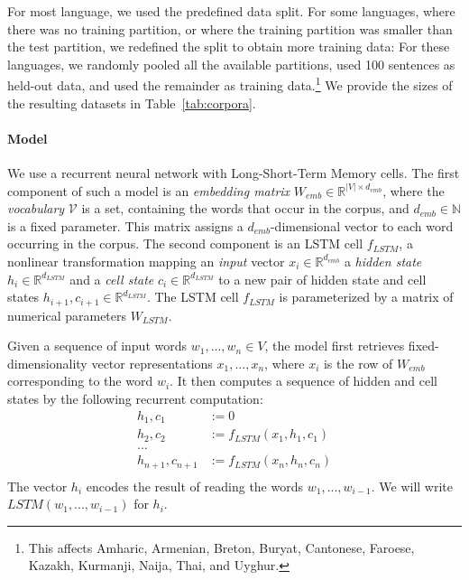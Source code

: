 \documentclass[11pt,letterpaper]{article}
\begin{document}
For most language, we used the predefined data split.
For some languages, where there was no training partition, or where the training partition was smaller than the test partition, we redefined the split to obtain more training data:
For these languages, we randomly pooled all the available partitions, used 100 sentences as held-out data, and used the remainder as training data.\footnote{This affects Amharic, Armenian, Breton, Buryat, Cantonese, Faroese, Kazakh, Kurmanji, Naija, Thai, and Uyghur.}
We provide the sizes of the resulting datasets in Table~\ref{tab:corpora}.



\paragraph{Model}
We use a recurrent neural network with Long-Short-Term Memory cells.
%
The first component of such a model is an \emph{embedding matrix} $W_{emb} \in \mathbb{R}^{|V| \times d_{emb}}$, where the \emph{vocabulary} $\mathcal{V}$ is a set, containing the words that occur in the corpus, and $d_{emb} \in \mathbb{N}$ is a fixed parameter.
This matrix assigns a $d_{emb}$-dimensional vector to each word occurring in the corpus.
The second component is an LSTM cell $f_{LSTM}$, a nonlinear transformation mapping an \emph{input} vector $x_{i} \in \mathbb{R}^{d_{emb}}$ a \emph{hidden state} $h_i \in \mathbb{R}^{d_{LSTM}}$ and a \emph{cell state} $c_i \in \mathbb{R}^{d_{LSTM}}$ to a new pair of hidden state and cell states $h_{i+1}, c_{i+1} \in \mathbb{R}^{d_{LSTM}}$.
The LSTM cell $f_{LSTM}$ is parameterized by a matrix of numerical parameters $W_{LSTM}$.

Given a sequence of input words $w_1, ..., w_n \in V$, the model first retrieves fixed-dimensionality vector representations $x_1, ..., x_n$, where $x_i$ is the row of $W_{emb}$ corresponding to the word $w_i$.
It then computes a sequence of hidden and cell states by the following recurrent computation:
\begin{align*}
	h_1, c_1 &:= 0 \\
	h_2, c_2 &:= f_{LSTM}(x_1, h_1, c_1) \\
	\dots \\
	h_{n+1}, c_{n+1} &:= f_{LSTM}(x_n, h_n, c_n) \\
\end{align*}
The vector $h_i$ encodes the result of reading the words $w_1, ..., w_{i-1}$.
We will write $LSTM(w_1, ..., w_{i-1})$ for $h_i$.
\end{document}
